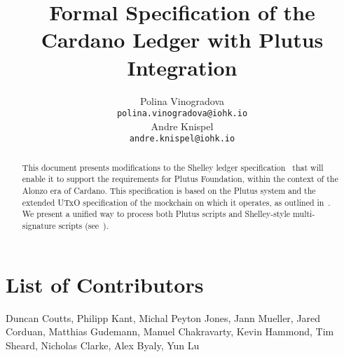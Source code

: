 

\cleardoublepage
\renewcommand{\thepage}{\arabic{page}}
\setcounter{page}{1}

\title{Formal Specification of the Cardano Ledger with Plutus
Integration}

\author{
   Polina Vinogradova \\ {\small \texttt{polina.vinogradova@iohk.io}} \\
   Andre Knispel \\ {\small \texttt{andre.knispel@iohk.io}} \\
   }

\date{}

\maketitle

\begin{abstract}
This document presents modifications to the Shelley ledger
specification~\cite{shelley_spec} that will enable it to support the requirements for Plutus Foundation, within the context of the Alonzo era
of Cardano. This specification is based on the Plutus system and the extended
UTxO specification of the mockchain on which it operates, as outlined in~\cite{chakravarty2020extended}.
%
We present a unified way to process both Plutus scripts and Shelley-style multi-signature scripts
(see~\cite{multi_sig}).
\end{abstract}

\section*{List of Contributors}
\label{acknowledgements}

Duncan Coutts,
Philipp Kant,
Michal Peyton Jones,
Jann Mueller,
Jared Corduan,
Matthias Gudemann,
Manuel Chakravarty,
Kevin Hammond,
Tim Sheard,
Nicholas Clarke,
Alex Byaly,
Yun Lu
